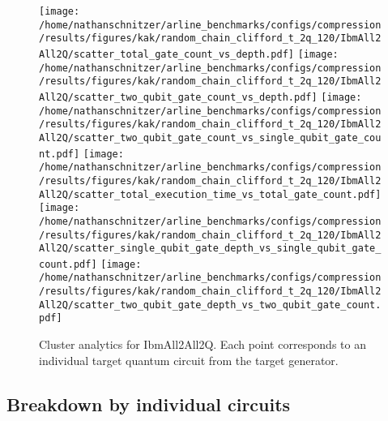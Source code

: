 \documentclass{report}%
\begin{document}
\begin{figure}[h!]%
\centering%
\texttt{[image: /home/nathanschnitzer/arline\_benchmarks/configs/compression/results/figures/kak/random\_chain\_clifford\_t\_2q\_120/IbmAll2All2Q/scatter\_total\_gate\_count\_vs\_depth.pdf]}%
\centering%
\texttt{[image: /home/nathanschnitzer/arline\_benchmarks/configs/compression/results/figures/kak/random\_chain\_clifford\_t\_2q\_120/IbmAll2All2Q/scatter\_two\_qubit\_gate\_count\_vs\_depth.pdf]}%
\linebreak%
\centering%
\texttt{[image: /home/nathanschnitzer/arline\_benchmarks/configs/compression/results/figures/kak/random\_chain\_clifford\_t\_2q\_120/IbmAll2All2Q/scatter\_two\_qubit\_gate\_count\_vs\_single\_qubit\_gate\_count.pdf]}%
\centering%
\texttt{[image: /home/nathanschnitzer/arline\_benchmarks/configs/compression/results/figures/kak/random\_chain\_clifford\_t\_2q\_120/IbmAll2All2Q/scatter\_total\_execution\_time\_vs\_total\_gate\_count.pdf]}%
\linebreak%
\centering%
\texttt{[image: /home/nathanschnitzer/arline\_benchmarks/configs/compression/results/figures/kak/random\_chain\_clifford\_t\_2q\_120/IbmAll2All2Q/scatter\_single\_qubit\_gate\_depth\_vs\_single\_qubit\_gate\_count.pdf]}%
\centering%
\texttt{[image: /home/nathanschnitzer/arline\_benchmarks/configs/compression/results/figures/kak/random\_chain\_clifford\_t\_2q\_120/IbmAll2All2Q/scatter\_two\_qubit\_gate\_depth\_vs\_two\_qubit\_gate\_count.pdf]}%
\linebreak%
\caption{Cluster analytics for IbmAll2All2Q. Each point corresponds to an individual target
                    quantum circuit from the target generator.}%
\end{figure}

%
\clearpage%
\subsection*{Breakdown by individual circuits }%
\label{subsec:Breakdownbyindividualcircuits}%

%
\end{document}
